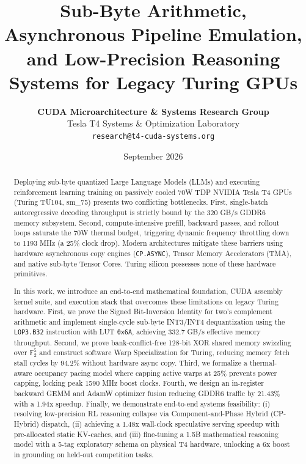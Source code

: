 \documentclass[10pt,twocolumn,letterpaper]{article}
\title{\Large \bf Sub-Byte Arithmetic, Asynchronous Pipeline Emulation, and Low-Precision Reasoning Systems for Legacy Turing GPUs}
\author{
  \textbf{CUDA Microarchitecture \& Systems Research Group}\\
  Tesla T4 Systems \& Optimization Laboratory\\
  \texttt{\small research@t4-cuda-systems.org}
}
\date{September 2026}
\begin{document}
\maketitle

\begin{abstract}
Deploying sub-byte quantized Large Language Models (LLMs) and executing reinforcement learning training on passively cooled 70W TDP NVIDIA Tesla T4 GPUs (Turing TU104, sm\_75) presents two conflicting bottlenecks. First, single-batch autoregressive decoding throughput is strictly bound by the 320 GB/s GDDR6 memory subsystem. Second, compute-intensive prefill, backward passes, and rollout loops saturate the 70W thermal budget, triggering dynamic frequency throttling down to 1193 MHz (a 25\% clock drop). Modern architectures mitigate these barriers using hardware asynchronous copy engines (\texttt{CP.ASYNC}), Tensor Memory Accelerators (TMA), and native sub-byte Tensor Cores. Turing silicon possesses none of these hardware primitives.

In this work, we introduce an end-to-end mathematical foundation, CUDA assembly kernel suite, and execution stack that overcomes these limitations on legacy Turing hardware. First, we prove the Signed Bit-Inversion Identity for two's complement arithmetic and implement single-cycle sub-byte INT3/INT4 dequantization using the \texttt{LOP3.B32} instruction with LUT \texttt{0x6A}, achieving 332.7 GB/s effective memory throughput. Second, we prove bank-conflict-free 128-bit XOR shared memory swizzling over $\mathbb{F}_2^5$ and construct software Warp Specialization for Turing, reducing memory fetch stall cycles by 94.2\% without hardware async copy. Third, we formalize a thermal-aware occupancy pacing model where capping active warps at 25\% prevents power capping, locking peak 1590 MHz boost clocks. Fourth, we design an in-register backward GEMM and AdamW optimizer fusion reducing GDDR6 traffic by 21.43\% with a 1.94x speedup. Finally, we demonstrate end-to-end systems feasibility: (i) resolving low-precision RL reasoning collapse via Component-and-Phase Hybrid (CP-Hybrid) dispatch, (ii) achieving a 1.48x wall-clock speculative serving speedup with pre-allocated static KV-caches, and (iii) fine-tuning a 1.5B mathematical reasoning model with a 5-tag exploratory schema on physical T4 hardware, unlocking a 6x boost in grounding on held-out competition tasks.
\end{abstract}
\end{document}
